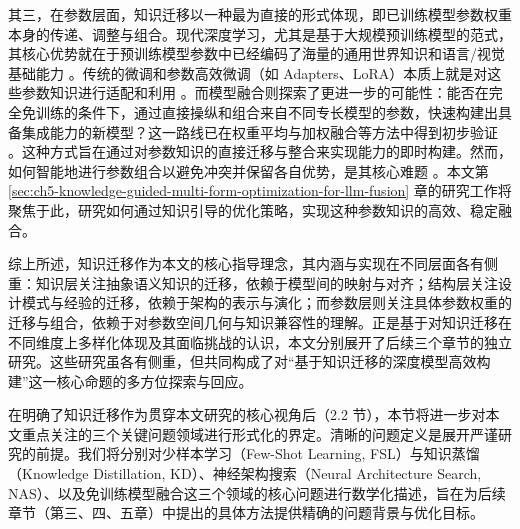\documentclass[../main.tex]{subfiles}
\begin{document}
其三，在参数层面，知识迁移以一种最为直接的形式体现，即已训练模型参数权重本身的传递、调整与组合。现代深度学习，尤其是基于大规模预训练模型的范式，其核心优势就在于预训练模型参数中已经编码了海量的通用世界知识和语言/视觉基础能力 \cite{bertpretraining_devlin_2019,languagemodelsare_brown_2020}。传统的微调和参数高效微调（如 Adapters、LoRA）本质上就是对这些参数知识进行适配和利用 \cite{parameterefficienttransfer_houlsby_2019,loralowrank_hu_2022}。而模型融合则探索了更进一步的可能性：能否在完全免训练的条件下，通过直接操纵和组合来自不同专长模型的参数，快速构建出具备集成能力的新模型？这一路线已在权重平均与加权融合等方法中得到初步验证 \cite{modelsoupsaveraging_wortsman_2022,mergingmodelsfisher_matena_2022,editingmodelstask_ilharco_2023}。这种方式旨在通过对参数知识的直接迁移与整合来实现能力的即时构建。然而，如何智能地进行参数组合以避免冲突并保留各自优势，是其核心难题 \cite{gitrebasin_ainsworth_2023,losssurfacesmode_garipov_2018}。本文第 \ref{sec:ch5-knowledge-guided-multi-form-optimization-for-llm-fusion} 章的研究工作将聚焦于此，研究如何通过知识引导的优化策略，实现这种参数知识的高效、稳定融合。

综上所述，知识迁移作为本文的核心指导理念，其内涵与实现在不同层面各有侧重：知识层关注抽象语义知识的迁移，依赖于模型间的映射与对齐；结构层关注设计模式与经验的迁移，依赖于架构的表示与演化；而参数层则关注具体参数权重的迁移与组合，依赖于对参数空间几何与知识兼容性的理解。正是基于对知识迁移在不同维度上多样化体现及其面临挑战的认识，本文分别展开了后续三个章节的独立研究。这些研究虽各有侧重，但共同构成了对“基于知识迁移的深度模型高效构建”这一核心命题的多方位探索与回应。

\label{sec:ch2-3-formalizing-key-problem-domain}

在明确了知识迁移作为贯穿本文研究的核心视角后（2.2 节），本节将进一步对本文重点关注的三个关键问题领域进行形式化的界定。清晰的问题定义是展开严谨研究的前提。我们将分别对少样本学习（Few-Shot Learning, FSL）与知识蒸馏（Knowledge Distillation, KD）、神经架构搜索（Neural Architecture Search, NAS）、以及免训练模型融合这三个领域的核心问题进行数学化描述，旨在为后续章节（第三、四、五章）中提出的具体方法提供精确的问题背景与优化目标。

\label{sec:ch2-3-1-few-shot-learning-and-distillation}
\end{document}
